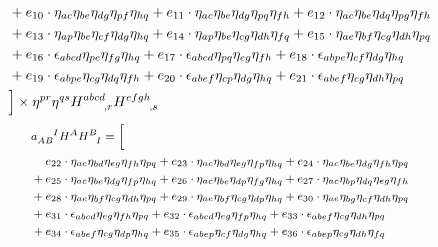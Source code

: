 \begin{itemize}
\begin{equation}
\begin{aligned}
    & + e_{10} \cdot \eta_{a c} \eta_{b e} \eta_{d g} \eta_{p f} \eta_{h q} + e_{11} \cdot \eta_{a c} \eta_{b e} \eta_{d g} \eta_{p q} \eta_{f h} + e_{12} \cdot \eta_{a c} \eta_{b e} \eta_{d q} \eta_{p g} \eta_{f h} \\
    & + e_{13} \cdot \eta_{a p} \eta_{b e} \eta_{c f} \eta_{d g} \eta_{h q} + e_{14} \cdot \eta_{a p} \eta_{b e} \eta_{c g} \eta_{d h} \eta_{f q} + e_{15} \cdot \eta_{a e} \eta_{b f} \eta_{c g} \eta_{d h} \eta_{p q} \\
    & + e_{16} \cdot \epsilon_{a b c d} \eta_{p e} \eta_{f g} \eta_{h q} + e_{17} \cdot \epsilon_{a b c d} \eta_{p q} \eta_{e g} \eta_{f h} + e_{18} \cdot \epsilon_{a b p e} \eta_{c f} \eta_{d g} \eta_{h q} \\
    & + e_{19} \cdot \epsilon_{a b p e} \eta_{c g} \eta_{d q} \eta_{f h} + e_{20} \cdot \epsilon_{a b e f} \eta_{c p} \eta_{d g} \eta_{h q} + e_{21} \cdot \epsilon_{a b e f} \eta_{c g} \eta_{d h} \eta_{p q} \\
    & \Big\rbrack \times \eta^{pr} \eta^{qs} H^{abcd}_{\hphantom{abcd},r} H^{efgh}_{\hphantom{efgh},s}
  \end{aligned}
\end{equation}
\begin{equation}
  \footnotesize
  \begin{aligned}
    & a_{AB}^{\hphantom{AB}I} H^A H^B_{\hphantom BI} = \Big\lbrack \\
    & \hphantom{{}+{}} e_{22} \cdot \eta_{a c} \eta_{b d} \eta_{e g} \eta_{f h} \eta_{p q} + e_{23} \cdot \eta_{a c} \eta_{b d} \eta_{e g} \eta_{f p} \eta_{h q} + e_{24} \cdot \eta_{a c} \eta_{b e} \eta_{d g} \eta_{f h} \eta_{p q} \\
    & + e_{25} \cdot \eta_{a c} \eta_{b e} \eta_{d g} \eta_{f p} \eta_{h q} + e_{26} \cdot \eta_{a c} \eta_{b e} \eta_{d p} \eta_{f g} \eta_{h q} + e_{27} \cdot \eta_{a c} \eta_{b p} \eta_{d q} \eta_{e g} \eta_{f h} \\
    & + e_{28} \cdot \eta_{a e} \eta_{b f} \eta_{c g} \eta_{d h} \eta_{p q} + e_{29} \cdot \eta_{a e} \eta_{b f} \eta_{c g} \eta_{d p} \eta_{h q} + e_{30} \cdot \eta_{a e} \eta_{b g} \eta_{c f} \eta_{d h} \eta_{p q} \\
    & + e_{31} \cdot \epsilon_{a b c d} \eta_{e g} \eta_{f h} \eta_{p q} + e_{32} \cdot \epsilon_{a b c d} \eta_{e g} \eta_{f p} \eta_{h q} + e_{33} \cdot \epsilon_{a b e f} \eta_{c g} \eta_{d h} \eta_{p q} \\
    & + e_{34} \cdot \epsilon_{a b e f} \eta_{c g} \eta_{d p} \eta_{h q} + e_{35} \cdot \epsilon_{a b e p} \eta_{c f} \eta_{d g} \eta_{h q} + e_{36} \cdot \epsilon_{a b e p} \eta_{c g} \eta_{d h} \eta_{f q} \\

\end{aligned}
\end{equation}
\end{itemize}
